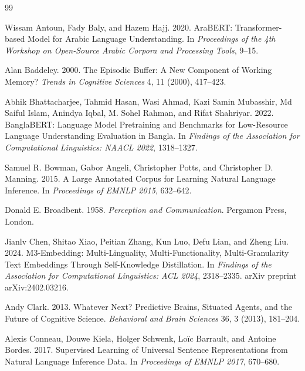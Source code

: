 \documentclass[manuscript]{acmart}
\begin{document}
\begin{thebibliography}{99}

Wissam Antoun, Fady Baly, and Hazem Hajj. 2020.
\newblock AraBERT: Transformer-based Model for Arabic Language Understanding.
\newblock In \emph{Proceedings of the 4th Workshop on Open-Source Arabic Corpora and Processing Tools}, 9--15.

Alan Baddeley. 2000.
\newblock The Episodic Buffer: A New Component of Working Memory?
\newblock \emph{Trends in Cognitive Sciences} 4, 11 (2000), 417--423.

Abhik Bhattacharjee, Tahmid Hasan, Wasi Ahmad, Kazi Samin Mubasshir, Md Saiful Islam, Anindya Iqbal, M. Sohel Rahman, and Rifat Shahriyar. 2022.
\newblock BanglaBERT: Language Model Pretraining and Benchmarks for Low-Resource Language Understanding Evaluation in Bangla.
\newblock In \emph{Findings of the Association for Computational Linguistics: NAACL 2022}, 1318--1327.

Samuel R. Bowman, Gabor Angeli, Christopher Potts, and Christopher D. Manning. 2015.
\newblock A Large Annotated Corpus for Learning Natural Language Inference.
\newblock In \emph{Proceedings of EMNLP 2015}, 632--642.

Donald E. Broadbent. 1958.
\newblock \emph{Perception and Communication}.
\newblock Pergamon Press, London.

Jianlv Chen, Shitao Xiao, Peitian Zhang, Kun Luo, Defu Lian, and Zheng Liu. 2024.
\newblock M3-Embedding: Multi-Linguality, Multi-Functionality, Multi-Granularity Text Embeddings Through Self-Knowledge Distillation.
\newblock In \emph{Findings of the Association for Computational Linguistics: ACL 2024}, 2318--2335. arXiv preprint arXiv:2402.03216.

Andy Clark. 2013.
\newblock Whatever Next? Predictive Brains, Situated Agents, and the Future of Cognitive Science.
\newblock \emph{Behavioral and Brain Sciences} 36, 3 (2013), 181--204.

Alexis Conneau, Douwe Kiela, Holger Schwenk, Loïc Barrault, and Antoine Bordes. 2017.
\newblock Supervised Learning of Universal Sentence Representations from Natural Language Inference Data.
\newblock In \emph{Proceedings of EMNLP 2017}, 670--680.


\end{thebibliography}
\end{document}
